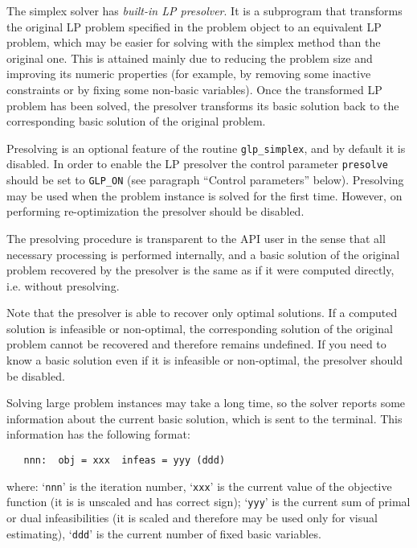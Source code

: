 
The simplex solver has {\it built-in LP presolver}. It is a subprogram
that transforms the original LP problem specified in the problem object
to an equivalent LP problem, which may be easier for solving with the
simplex method than the original one. This is attained mainly due to
reducing the problem size and improving its numeric properties (for
example, by removing some inactive constraints or by fixing some
non-basic variables). Once the transformed LP problem has been solved,
the presolver transforms its basic solution back to the corresponding
basic solution of the original problem.

Presolving is an optional feature of the routine \verb|glp_simplex|,
and by default it is disabled. In order to enable the LP presolver the
control parameter \verb|presolve| should be set to \verb|GLP_ON| (see
paragraph ``Control parameters'' below). Presolving may be used when
the problem instance is solved for the first time. However, on
performing re-optimization the presolver should be disabled.

The presolving procedure is transparent to the API user in the sense
that all necessary processing is performed internally, and a basic
solution of the original problem recovered by the presolver is the same
as if it were computed directly, i.e. without presolving.

Note that the presolver is able to recover only optimal solutions. If
a computed solution is infeasible or non-optimal, the corresponding
solution of the original problem cannot be recovered and therefore
remains undefined. If you need to know a basic solution even if it is
infeasible or non-optimal, the presolver should be disabled.


Solving large problem instances may take a long time, so the solver
reports some information about the current basic solution, which is sent
to the terminal. This information has the following format:

\begin{verbatim}
   nnn:  obj = xxx  infeas = yyy (ddd)
\end{verbatim}

\noindent
where: `\verb|nnn|' is the iteration number, `\verb|xxx|' is the
current value of the objective function (it is is unscaled and has
correct sign); `\verb|yyy|' is the current sum of primal or dual
infeasibilities (it is scaled and therefore may be used only for visual
estimating), `\verb|ddd|' is the current number of fixed basic
variables.

